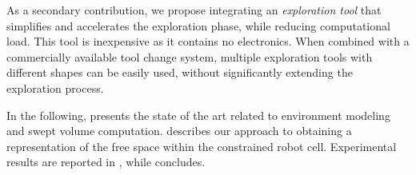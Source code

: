 As a secondary contribution, 
we propose integrating an \textit{exploration tool} that simplifies and accelerates the exploration phase, 
while reducing computational load. 
This tool is inexpensive as it contains no electronics. 
When combined with a commercially available tool change system, 
multiple exploration tools with different shapes can be easily used, 
without significantly extending the exploration process.

In the following,
 presents the state of the art related to environment modeling and swept volume computation. 
 describes our approach to obtaining a representation of the free space within the constrained robot cell. 
Experimental results are reported in , %
while  concludes. %

